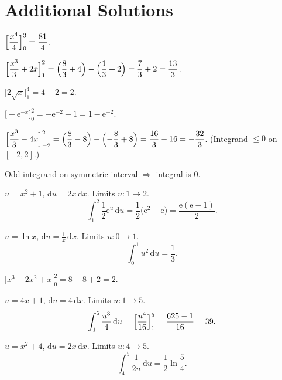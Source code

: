 \section{Additional Solutions}

\begin{solutions}
  \item $\displaystyle\Bigl[\frac{x^{4}}{4}\Bigr]_{0}^{3}=\frac{81}{4}$.

  \item $\displaystyle\Bigl[\frac{x^{3}}{3}+2x\Bigr]_{1}^{2}
        =\Bigl(\frac{8}{3}+4\Bigr)-\Bigl(\frac{1}{3}+2\Bigr)
        =\frac{7}{3}+2=\frac{13}{3}$.

  \item $\displaystyle\bigl[2\sqrt{x}\bigr]_{1}^{4}=4-2=2$.

  \item $\displaystyle\bigl[-\mathrm{e}^{-x}\bigr]_{0}^{2}
        =-\mathrm{e}^{-2}+1=1-\mathrm{e}^{-2}$.

  \item $\displaystyle\Bigl[\frac{x^{3}}{3}-4x\Bigr]_{-2}^{2}
        =\Bigl(\frac{8}{3}-8\Bigr)-\Bigl(-\frac{8}{3}+8\Bigr)
        =\frac{16}{3}-16=-\frac{32}{3}$.
        (Integrand $\le 0$ on $[-2,2]$.)

  \item Odd integrand on symmetric interval $\Rightarrow$ integral is $0$.

  \item $u=x^{2}+1$, $\mathrm{d}u=2x\,\mathrm{d}x$. Limits $u:1\to 2$.
        \[
          \int_{1}^{2} \frac{1}{2}\mathrm{e}^{u}\,\mathrm{d}u
            =\frac{1}{2}\bigl(\mathrm{e}^{2}-\mathrm{e}\bigr)
            =\frac{\mathrm{e}(\mathrm{e}-1)}{2} .
        \]

  \item $u=\ln x$, $\mathrm{d}u=\frac{1}{x}\,\mathrm{d}x$. Limits
        $u:0\to 1$.
        \[
          \int_{0}^{1} u^{2}\,\mathrm{d}u=\frac{1}{3} .
        \]

  \item $\displaystyle\bigl[x^{3}-2x^{2}+x\bigr]_{0}^{2}=8-8+2=2$.

  \item $u=4x+1$, $\mathrm{d}u=4\,\mathrm{d}x$. Limits $u:1\to 5$.
        \[
          \int_{1}^{5} \frac{u^{3}}{4}\,\mathrm{d}u
            =\Bigl[\frac{u^{4}}{16}\Bigr]_{1}^{5}=\frac{625-1}{16}=39 .
        \]

  \item $u=x^{2}+4$, $\mathrm{d}u=2x\,\mathrm{d}x$. Limits $u:4\to 5$.
        \[
          \int_{4}^{5} \frac{1}{2u}\,\mathrm{d}u=\frac{1}{2}\ln\frac{5}{4} .
        \]


\end{solutions}
